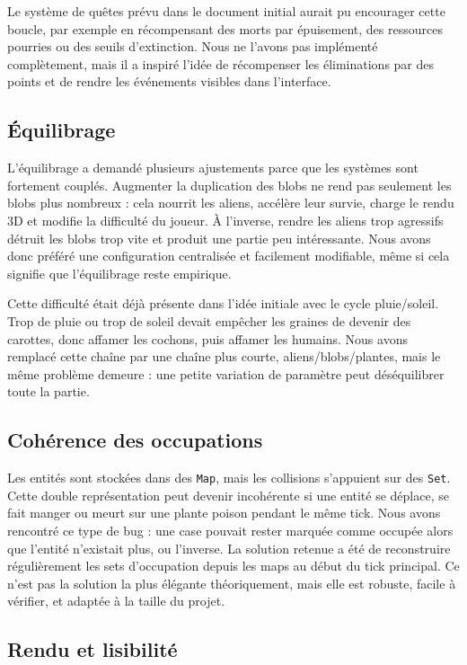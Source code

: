 ﻿\documentclass[11pt,a4paper]{article}
\begin{document}
Le système de quêtes prévu dans le document initial aurait pu encourager cette boucle, par exemple en récompensant des morts par épuisement, des ressources pourries ou des seuils d'extinction. Nous ne l'avons pas implémenté complètement, mais il a inspiré l'idée de récompenser les éliminations par des points et de rendre les événements visibles dans l'interface.

\subsection{Équilibrage}

L'équilibrage a demandé plusieurs ajustements parce que les systèmes sont fortement couplés. Augmenter la duplication des blobs ne rend pas seulement les blobs plus nombreux : cela nourrit les aliens, accélère leur survie, charge le rendu 3D et modifie la difficulté du joueur. À l'inverse, rendre les aliens trop agressifs détruit les blobs trop vite et produit une partie peu intéressante. Nous avons donc préféré une configuration centralisée et facilement modifiable, même si cela signifie que l'équilibrage reste empirique.

Cette difficulté était déjà présente dans l'idée initiale avec le cycle pluie/soleil. Trop de pluie ou trop de soleil devait empêcher les graines de devenir des carottes, donc affamer les cochons, puis affamer les humains. Nous avons remplacé cette chaîne par une chaîne plus courte, aliens/blobs/plantes, mais le même problème demeure : une petite variation de paramètre peut déséquilibrer toute la partie.

\subsection{Cohérence des occupations}

Les entités sont stockées dans des \texttt{Map}, mais les collisions s'appuient sur des \texttt{Set}. Cette double représentation peut devenir incohérente si une entité se déplace, se fait manger ou meurt sur une plante poison pendant le même tick. Nous avons rencontré ce type de bug : une case pouvait rester marquée comme occupée alors que l'entité n'existait plus, ou l'inverse. La solution retenue a été de reconstruire régulièrement les sets d'occupation depuis les maps au début du tick principal. Ce n'est pas la solution la plus élégante théoriquement, mais elle est robuste, facile à vérifier, et adaptée à la taille du projet.

\subsection{Rendu et lisibilité}
\end{document}
